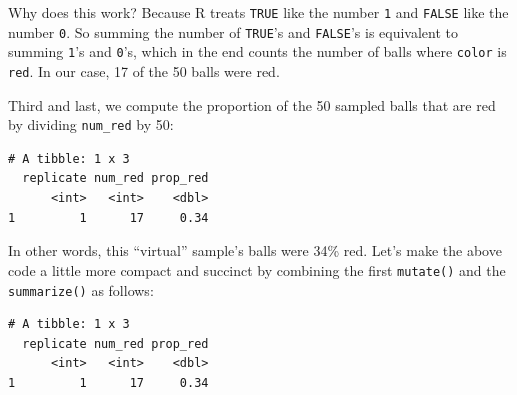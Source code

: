 \documentclass[12pt, krantz2,]{krantz}
\makeatletter
\newenvironment{Shaded}{\begin{snugshade}}{\end{snugshade}}
\newcommand{\DataTypeTok}[1]{\textcolor[rgb]{0.27,0.27,0.27}{#1}}
\newcommand{\DecValTok}[1]{\textcolor[rgb]{0.06,0.06,0.06}{#1}}
\newcommand{\KeywordTok}[1]{\textcolor[rgb]{0.27,0.27,0.27}{\textbf{#1}}}
\newcommand{\NormalTok}[1]{#1}
\newcommand{\OperatorTok}[1]{\textcolor[rgb]{0.43,0.43,0.43}{\textbf{#1}}}
\newcommand{\StringTok}[1]{\textcolor[rgb]{0.5,0.5,0.5}{#1}}
\newenvironment{kframe}{%
\medskip{}
\setlength{\fboxsep}{.8em}
 \def\at@end@of@kframe{}%
 \ifinner\ifhmode%
  \def\at@end@of@kframe{\end{minipage}}%
  \begin{minipage}{\columnwidth}%
 \fi\fi%
 \def\FrameCommand##1{\hskip\@totalleftmargin \hskip-\fboxsep
 \colorbox{shadecolor}{##1}\hskip-\fboxsep
     \hskip-\linewidth \hskip-\@totalleftmargin \hskip\columnwidth}%
 \MakeFramed {\advance\hsize-\width
   \@totalleftmargin\z@ \linewidth\hsize
   \@setminipage}}%
 {\par\unskip\endMakeFramed%
 \at@end@of@kframe}
\renewenvironment{Shaded}{\begin{kframe}}{\end{kframe}}
\makeatother
\begin{document}
Why does this work? Because R treats \texttt{TRUE} like the number \texttt{1} and \texttt{FALSE} like the number \texttt{0}. So summing the number of \texttt{TRUE}'s and \texttt{FALSE}'s is equivalent to summing \texttt{1}'s and \texttt{0}'s, which in the end counts the number of balls where \texttt{color} is \texttt{red}. In our case, 17 of the 50 balls were red.

Third and last, we compute the proportion of the 50 sampled balls that are red by dividing \texttt{num\_red} by 50:

\begin{Shaded}
\end{Shaded}

\begin{verbatim}
# A tibble: 1 x 3
  replicate num_red prop_red
      <int>   <int>    <dbl>
1         1      17     0.34
\end{verbatim}

In other words, this ``virtual'' sample's balls were 34\% red. Let's make the above code a little more compact and succinct by combining the first \texttt{mutate()} and the \texttt{summarize()} as follows:

\begin{Shaded}
\end{Shaded}

\begin{verbatim}
# A tibble: 1 x 3
  replicate num_red prop_red
      <int>   <int>    <dbl>
1         1      17     0.34
\end{verbatim}
\end{document}
